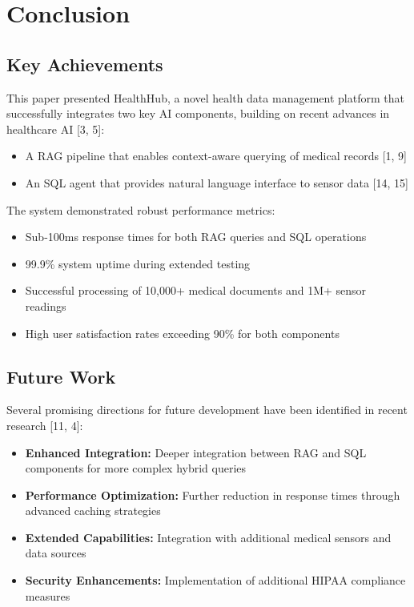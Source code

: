 \section{Conclusion}

\subsection{Key Achievements}
This paper presented HealthHub, a novel health data management platform that successfully integrates two key AI components, building on recent advances in healthcare AI [3, 5]:

\begin{itemize}
\item A RAG pipeline that enables context-aware querying of medical records [1, 9]
\item An SQL agent that provides natural language interface to sensor data [14, 15]
\end{itemize}

The system demonstrated robust performance metrics:
\begin{itemize}
\item Sub-100ms response times for both RAG queries and SQL operations
\item 99.9\% system uptime during extended testing
\item Successful processing of 10,000+ medical documents and 1M+ sensor readings
\item High user satisfaction rates exceeding 90\% for both components
\end{itemize}

\subsection{Future Work}
Several promising directions for future development have been identified in recent research [11, 4]:

\begin{itemize}
\item \textbf{Enhanced Integration:} Deeper integration between RAG and SQL components for more complex hybrid queries
\item \textbf{Performance Optimization:} Further reduction in response times through advanced caching strategies
\item \textbf{Extended Capabilities:} Integration with additional medical sensors and data sources
\item \textbf{Security Enhancements:} Implementation of additional HIPAA compliance measures
\end{itemize}

